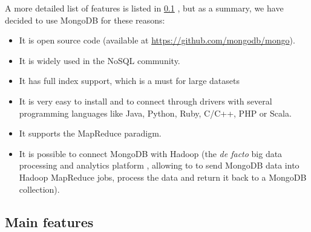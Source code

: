 A more detailed list of features is listed in \ref{features_mongo} , but as a summary, we have decided to use MongoDB for these reasons:

\begin{itemize}
\item It is open source code (available at \url{https://github.com/mongodb/mongo}).
\item It is widely used in the NoSQL community.
\item It has full index %
support, which is a must for large datasets
\item It is very
easy to install and to connect through drivers with several programming languages like Java, Python, Ruby, C/C++, PHP or Scala.
\item It supports
the
MapReduce paradigm.
\item It is possible to connect MongoDB with Hadoop (the \emph{de facto} big data processing and analytics platform ,
allowing to to send MongoDB data into Hadoop MapReduce jobs, process the data and return it back to a MongoDB collection).
\end{itemize}

\subsection{Main features} \label{features_mongo}

